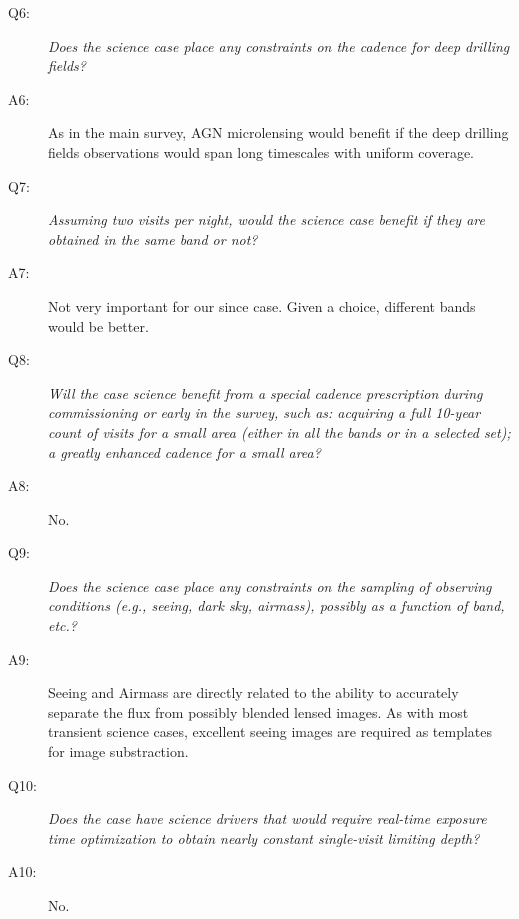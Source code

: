 \begin{description}
\item[Q6:] {\it Does the science case place any constraints on the
cadence for deep drilling fields?}

\item[A6:] As in the main survey, AGN microlensing would benefit if the deep drilling fields observations would span long timescales with uniform coverage.

\item[Q7:] {\it Assuming two visits per night, would the science case
benefit if they are obtained in the same band or not?}

\item[A7:] Not very important for our since case. Given a choice, different bands would be better.

\item[Q8:] {\it Will the case science benefit from a special cadence
prescription during commissioning or early in the survey, such as:
acquiring a full 10-year count of visits for a small area (either in all
the bands or in a  selected set); a greatly enhanced cadence for a small
area?}

\item[A8:] No.

\item[Q9:] {\it Does the science case place any constraints on the
sampling of observing conditions (e.g., seeing, dark sky, airmass),
possibly as a function of band, etc.?}

\item[A9:] Seeing and Airmass are directly related to the ability to
accurately separate the flux from possibly blended lensed images. As
with most transient science cases, excellent seeing images are required
as templates for image substraction.

\item[Q10:] {\it Does the case have science drivers that would require
real-time exposure time optimization to obtain nearly constant
single-visit limiting depth?}

\item[A10:] No.

\end{description}


%
%
%
%

\navigationbar
